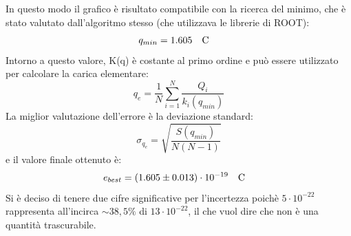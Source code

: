 \documentclass{article}
\begin{document}
    
    In questo modo il grafico è risultato compatibile con la ricerca del minimo, che è stato valutato dall'algoritmo stesso (che utilizzava le librerie di ROOT):
        \[ q_{min} = 1.605 \qq{C}\]
    Intorno a questo valore, K(q) è costante al primo ordine e può essere utilizzato per calcolare la carica elementare:
        \[q_e = \frac{1}{N}\sum_{i=1}^N\frac{Q_i}{k_i(q_{min})}\]
    La miglior valutazione dell'errore è la deviazione standard:
        \[\sigma_{q_e} = \sqrt{\frac{S(q_{min})}{N(N-1)}}\]
    e il valore finale ottenuto è:
          \[ e_{best} = (1.605 \pm 0.013)\cdot 10^{-19} \qq{C}
    \]
    Si è deciso di tenere due cifre significative per l'incertezza poichè $5\cdot10^{-22}$ rappresenta all'incirca $\sim 38,5\%$ di $13\cdot10^{-22}$, il che vuol dire che non è una quantità trascurabile.
    
\newpage
\end{document}
